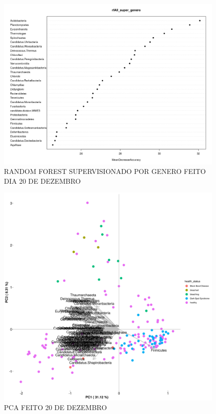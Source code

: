 \documentclass[12pt, a4paper]{report}
\begin{document}
\begin{figure}[H]
	\centering
	\includegraphics[scale=0.3]{figures/RF_super_genero_2018_12_20.png}
	\caption{RANDOM FOREST SUPERVISIONADO POR GENERO FEITO DIA 20 DE DEZEMBRO}
	\label{fig: RANDOM FOREST SUPERVISIONADO POR GENERO FEITO DIA 20 DE DEZEMBRO}
\end{figure}

\begin{figure}[H]
	\centering
	\includegraphics[scale=0.4]{figures/PCA_health_corais_2018_12_20.png}
	\caption{PCA FEITO 20 DE DEZEMBRO}
	\label{fig: PCA GERAL FEITO DIA 20 DE DEZEMBRO VISUALIZANDO CATEGORIA SAÚDE}
\end{figure}	
\end{document}
